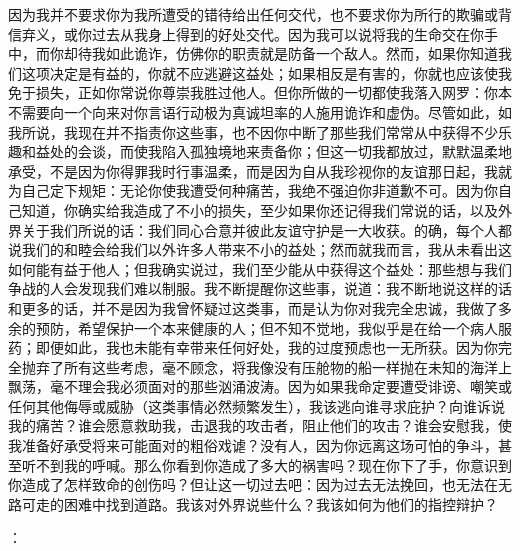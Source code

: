 因为我并不要求你为我所遭受的错待给出任何交代，也不要求你为所行的欺骗或背信弃义，或你过去从我身上得到的好处交代。因为我可以说将我的生命交在你手中，而你却待我如此诡诈，仿佛你的职责就是防备一个敌人。然而，如果你知道我们这项决定是有益的，你就不应逃避这益处；如果相反是有害的，你就也应该使我免于损失，正如你常说你尊崇我胜过他人。但你所做的一切都使我落入网罗：你本不需要向一个向来对你言语行动极为真诚坦率的人施用诡诈和虚伪。尽管如此，如我所说，我现在并不指责你这些事，也不因你中断了那些我们常常从中获得不少乐趣和益处的会谈，而使我陷入孤独境地来责备你；但这一切我都放过，默默温柔地承受，不是因为你得罪我时行事温柔，而是因为自从我珍视你的友谊那日起，我就为自己定下规矩：无论你使我遭受何种痛苦，我绝不强迫你非道歉不可。因为你自己知道，你确实给我造成了不小的损失，至少如果你还记得我们常说的话，以及外界关于我们所说的话：我们同心合意并彼此友谊守护是一大收获。的确，每个人都说我们的和睦会给我们以外许多人带来不小的益处；然而就我而言，我从未看出这如何能有益于他人；但我确实说过，我们至少能从中获得这个益处：那些想与我们争战的人会发现我们难以制服。我不断提醒你这些事，说道：我不断地说这样的话和更多的话，并不是因为我曾怀疑过这类事，而是认为你对我完全忠诚，我做了多余的预防，希望保护一个本来健康的人；但不知不觉地，我似乎是在给一个病人服药；即便如此，我也未能有幸带来任何好处，我的过度预虑也一无所获。因为你完全抛弃了所有这些考虑，毫不顾念，将我像没有压舱物的船一样抛在未知的海洋上飘荡，毫不理会我必须面对的那些汹涌波涛。因为如果我命定要遭受诽谤、嘲笑或任何其他侮辱或威胁（这类事情必然频繁发生），我该逃向谁寻求庇护？向谁诉说我的痛苦？谁会愿意救助我，击退我的攻击者，阻止他们的攻击？谁会安慰我，使我准备好承受将来可能面对的粗俗戏谑？没有人，因为你远离这场可怕的争斗，甚至听不到我的呼喊。那么你看到你造成了多大的祸害吗？现在你下了手，你意识到你造成了怎样致命的创伤吗？但让这一切过去吧：因为过去无法挽回，也无法在无路可走的困难中找到道路。我该对外界说些什么？我该如何为他们的指控辩护？\par

：\par

